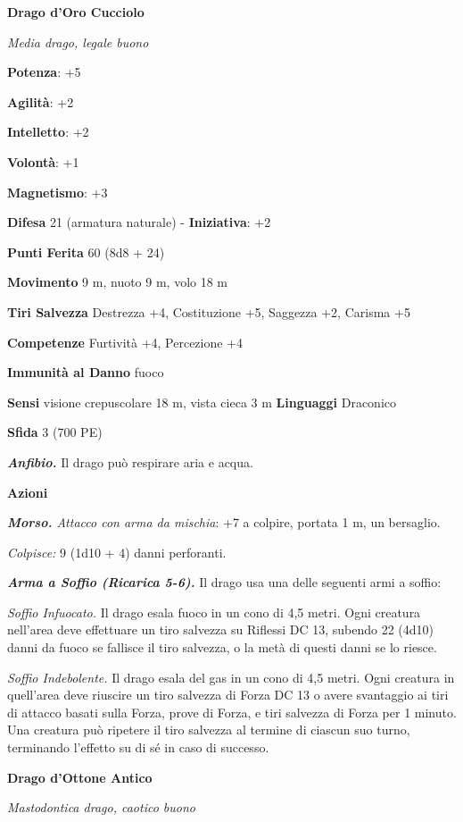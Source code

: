 \begin{multicols}{2}
\textbf{Drago d'Oro Cucciolo}

\emph{Media drago, legale buono}

\textbf{Potenza}: +5

\textbf{Agilità}: +2

\textbf{Intelletto}: +2

\textbf{Volontà}: +1

\textbf{Magnetismo}: +3

\textbf{Difesa} 21 (armatura naturale) - \textbf{Iniziativa}: +2

\textbf{Punti Ferita} 60 (8d8 + 24)

\textbf{Movimento} 9 m, nuoto 9 m, volo 18 m

\textbf{Tiri Salvezza} Destrezza +4, Costituzione +5, Saggezza +2,
Carisma +5

\textbf{Competenze} Furtività +4, Percezione +4

\textbf{Immunità al Danno} fuoco

\textbf{Sensi} visione crepuscolare 18 m, vista cieca 3 m
\textbf{Linguaggi} Draconico

\textbf{Sfida} 3 (700 PE)\smallskip

\emph{\textbf{Anfibio.}} Il drago può respirare aria e acqua.

\smallskip\textbf{Azioni}

\emph{\textbf{Morso.} Attacco con arma da mischia}: +7 a colpire,
portata 1 m, un bersaglio.

\emph{Colpisce:} 9 (1d10 + 4) danni perforanti.

\emph{\textbf{Arma a Soffio (Ricarica 5-6).}} Il drago usa una delle
seguenti armi a soffio:

\emph{Soffio Infuocato.} Il drago esala fuoco in un cono di 4,5 metri.
Ogni creatura nell'area deve effettuare un tiro salvezza su Riflessi DC
13, subendo 22 (4d10) danni da fuoco se fallisce il tiro salvezza, o la
metà di questi danni se lo riesce.

\emph{Soffio Indebolente.} Il drago esala del gas in un cono di 4,5
metri. Ogni creatura in quell'area deve riuscire un tiro salvezza di Forza DC 13 o avere svantaggio ai tiri di attacco basati sulla Forza,
prove di Forza, e tiri salvezza di Forza per 1 minuto. Una creatura può
ripetere il tiro salvezza al termine di ciascun suo turno, terminando
l'effetto su di sé in caso di successo.



\textbf{Drago d'Ottone Antico}

\emph{Mastodontica drago, caotico buono}


\end{multicols}
